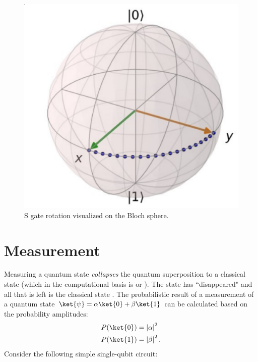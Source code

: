 \documentclass[11pt, notitlepage]{report}
\begin{document}
\begin{figure}[ht]
  \centering
  \includegraphics[scale=0.21]{images/s_gate.eps}
  \vspace{1mm}
  \caption{S gate rotation visualized on the Bloch sphere.}
  \label{fig:s_bloch}
\end{figure}

\section{Measurement}
Measuring a quantum state \ket{\psi} \emph{collapses} the quantum superposition to a classical state  (which in the computational basis is  or ). The state \ket{\psi} has ``disappeared" and all that is left is the classical state . The probabilistic result of a measurement of a quantum state $\ket{\psi} = \alpha\ket{0} + \beta\ket{1}$ can be calculated based on the probability amplitudes:
\begin{equation}
\begin{aligned}
  P(\ket{0}) &= \left|\alpha\right|^2 \\
  P(\ket{1}) &= \left|\beta\right|^2.
\end{aligned}
\end{equation}
Consider the following simple single-qubit circuit:
\end{document}
